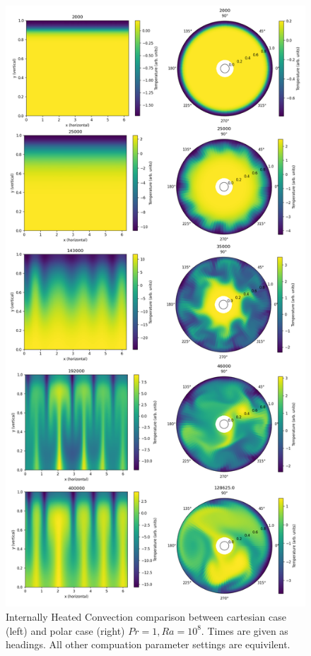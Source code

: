 \documentclass{article}
\begin{document}
\begin{figure}[h!]
	\centering
	\includegraphics{big fig.png}
	\caption{Internally Heated Convection comparison between cartesian 
	case (left) and polar case (right) $Pr=1, Ra=10^8$. Times are given as headings. All other compuation parameter settings are equivilent.}
	\label{cartesian vs polar}
\end{figure}
\end{document}
